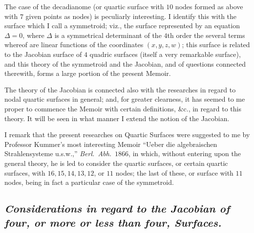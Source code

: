 \documentclass[11pt,a4paper]{article}
\begin{document}
\medskip

The case of the decadianome (or quartic surface with $10$ nodes formed as above with $7$
given points as nodes) is peculiarly interesting. I identify this with the surface which
I call a symmetroid; viz., the surface represented by an equation $\Delta = 0$, where
$\Delta$ is a symmetrical determinant of the $4$th order the several terms whereof are
linear functions of the coordinates $(x, y, z, w)$; this surface is related to the Jacobian
surface of $4$ quadric surfaces (itself a very remarkable surface), and this theory of the
symmetroid and the Jacobian, and of questions connected therewith, forms a large portion of
the present Memoir.

\medskip

The theory of the Jacobian is connected also with the researches in regard to nodal quartic
surfaces in general; and, for greater clearness, it has seemed to me proper to commence the
Memoir with certain definitions, \&c., in regard to this theory. It will be seen in what
manner I extend the notion of the Jacobian.

\medskip

I remark that the present researches on Quartic Surfaces were suggested to me by Professor
Kummer's most interesting Memoir ``Ueber die algebraischen Strahlensysteme u.s.w.,''
\textit{Berl.\ Abh.}\ $1866$, in which, without entering upon the general theory, he is led
to consider the quartic surfaces, or certain quartic surfaces, with $16, 15, 14, 13, 12$,
or $11$ nodes; the last of these, or surface with $11$ nodes, being in fact a particular
case of the symmetroid.

\subsection*{\textit{Considerations in regard to the Jacobian of four, or more or less than four, Surfaces.}}
\end{document}
